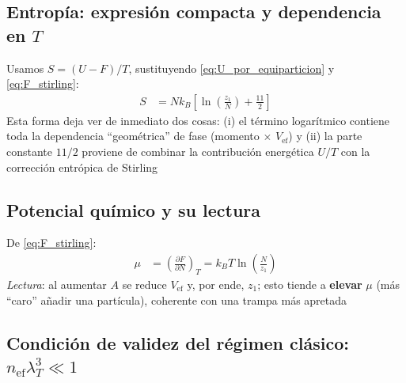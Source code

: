 \documentclass{article}
\begin{document}
\subsection*{Entropía: expresión compacta y dependencia en $T$}

Usamos $S=(U-F)/T$, sustituyendo \eqref{eq:U_por_equiparticion} y \eqref{eq:F_stirling}:
\begin{equation}
\begin{split}
S
&= N k_B\left[\ln\!\left(\frac{z_1}{N}\right) + \frac{11}{2}\right]
\end{split}\label{eq:S_compacto}
\end{equation}
Esta forma deja ver de inmediato dos cosas: (i) el término logarítmico contiene toda la dependencia “geométrica” de fase (momento $\times$ $V_{\text{ef}}$) y (ii) la parte constante $11/2$ proviene de combinar la contribución energética $U/T$ con la corrección entrópica de Stirling

\subsection*{Potencial químico y su lectura}

De \eqref{eq:F_stirling}:
\begin{equation}
\begin{split}
\mu
&= \left(\frac{\partial F}{\partial N}\right)_{T}
= k_B T \ln\!\left(\frac{N}{z_1}\right)
\end{split}\label{eq:mu_resultado}
\end{equation}
\textit{Lectura}: al aumentar $A$ se reduce $V_{\text{ef}}$ y, por ende, $z_1$; esto tiende a \textbf{elevar} $\mu$ (más “caro” añadir una partícula), coherente con una trampa más apretada

\subsection*{Condición de validez del régimen clásico: $n_{\text{ef}}\lambda_T^3\ll 1$}
\end{document}

